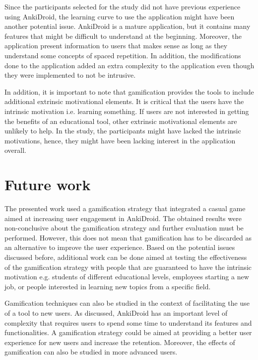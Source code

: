 Since the participants selected for the study did not have previous experience using AnkiDroid, the learning curve to use the application might have been another potential issue. AnkiDroid is a mature application, but it contains many features that might be difficult to understand at the beginning. Moreover, the application present information to users that makes sense as long as they understand some concepts of spaced repetition. In addition, the modifications done to the application added an extra complexity to the application even though they were implemented to not be intrusive.

In addition, it is important to note that gamification provides the tools to include additional extrinsic motivational elements. It is critical that the users have the intrinsic motivation i.e. learning something. If users are not interested in getting the benefits of an educational tool, other extrinsic motivational elements are unlikely to help. In the study, the participants might have lacked the intrinsic motivations, hence, they might have been lacking interest in the application overall.

\section{Future work}
The presented work used a gamification strategy that integrated a casual game aimed at increasing user engagement in AnkiDroid. The obtained results were non-conclusive about the gamification strategy and further evaluation must be performed. However, this does not mean that gamification has to be discarded as an alternative to improve the user experience. Based on the potential issues discussed before, additional work can be done aimed at testing the effectiveness of the gamification strategy with people that are guaranteed to have the intrinsic motivation e.g. students of different educational levels, employees starting a new job, or people interested in learning new topics from a specific field.

Gamification techniques can also be studied in the context of facilitating the use of a tool to new users. As discussed, AnkiDroid has an important level of complexity that requires users to spend some time to understand its features and functionalities. A gamification strategy could be aimed at providing a better user experience for new users and increase the retention. Moreover, the effects of gamification can also be studied in more advanced users.